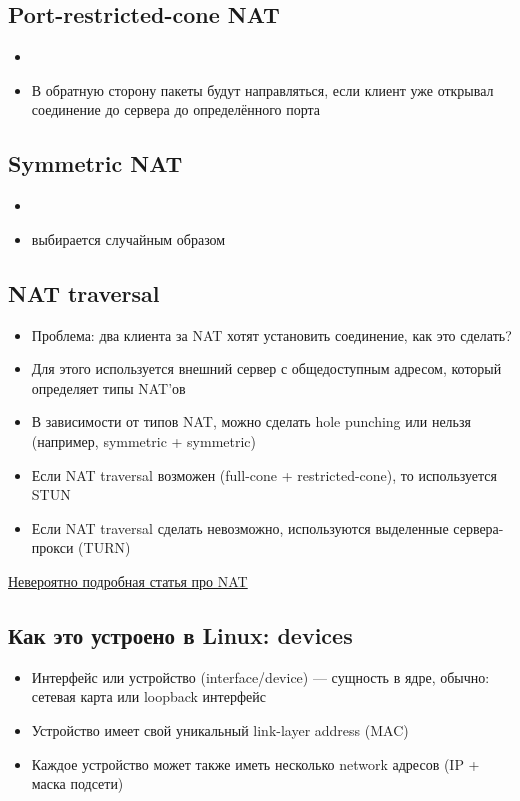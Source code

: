   \subsection{Port-restricted-cone NAT}
    \begin{itemize}
      \item {}
      \item В обратную сторону пакеты будут направляться, если клиент уже открывал соединение до сервера до определённого порта
    \end{itemize}
  
  \subsection{Symmetric NAT}
    \begin{itemize}
      \item {}
      \item {} выбирается случайным образом
    \end{itemize}
  
  \subsection{NAT traversal}
    \begin{itemize}
      \item Проблема: два клиента за NAT хотят установить соединение, как это сделать?
      \item Для этого используется внешний сервер с общедоступным адресом, который определяет типы NAT'ов
      \item В зависимости от типов NAT, можно сделать hole punching или нельзя (например, symmetric + symmetric)
      \item Если NAT traversal возможен (full-cone + restricted-cone), то используется STUN
      \item Если NAT traversal сделать невозможно, используются выделенные сервера-прокси (TURN)
    \end{itemize}
    
    \href{https://tailscale.com/blog/how-nat-traversal-works/}{Невероятно подробная статья про NAT}
  
  \subsection{Как это устроено в Linux: devices}
    \begin{itemize}
      \item Интерфейс или устройство (interface/device) — сущность в ядре, обычно: сетевая карта или loopback интерфейс
      \item Устройство имеет свой уникальный link-layer address (MAC) 
      \item Каждое устройство может также иметь несколько network адресов (IP + маска подсети) 
    \end{itemize}
  
